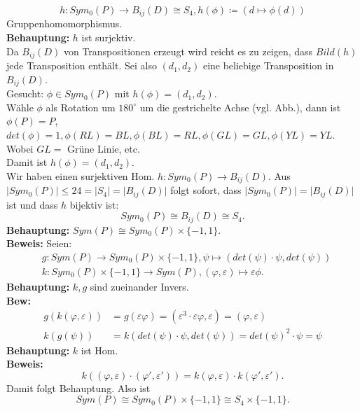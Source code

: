 \begin{problem*}[3]
\begin{equation*}
	h: Sym_0(P) \to B_{ ij }(D) \cong S_4, h(\phi) \coloneqq (d \mapsto \phi(d))
\end{equation*}
Gruppenhomomorphismus.\\
\textbf{Behauptung:} $ h $ ist surjektiv.\\
Da $ B_{ ij }(D)  $ von Transpositionen erzeugt wird reicht es zu zeigen, dass $ Bild(h) $ jede Transposition enthält. Sei also $ (d_1,d_2) $ eine beliebige Transposition in $ B_{ ij }(D)$.\\
Gesucht: $\phi \in Sym_0(P)$ mit $h(\phi) = (d_1,d_2).$\\
Wähle $ \phi $ als Rotation um $ 180^{ \circ } $ um die gestrichelte Achse (vgl. Abb.), dann ist $\phi(P) = P$, $det(\phi) = 1, \phi(RL) = BL, \phi(BL) = RL, \phi(GL) = GL, \phi(YL) = YL$. Wobei $ GL =$ Grüne Linie, etc.\\ 
Damit ist $h(\phi) = (d_1, d_2).$\\
Wir haben einen surjektiven Hom. $h: Sym_0(P) \to B_{ ij }(D)$. Aus $ \vert Sym_0(P) \vert \leq 24 = \vert S_4 \vert = \vert B_{ ij }(D) \vert$ folgt sofort, dass $\vert Sym_0(P) \vert = \vert B_{ ij }(D) \vert$ ist und dass $ h $ bijektiv ist:
\begin{equation*}
	Sym_0(P) \cong B_{ ij }(D) \cong S_4.
\end{equation*}
\textbf{Behauptung:} $Sym(P) \cong Sym_0(P) \times \{ -1, 1 \}.$\\
\textbf{Beweis:} Seien:
\begin{align*}
	&g: Sym(P) \to Sym_0(P) \times \{ -1, 1 \}, \psi \mapsto (det(\psi) \cdot \psi,det(\psi)) \\
	&k: Sym_0(P) \times \{ -1, 1 \} \to Sym(P), (\varphi, \varepsilon) \mapsto \varepsilon \phi.
\end{align*}
\textbf{Behauptung:} $ k,g $ sind zueinander Invers.\\
\textbf{Bew:} 
\begin{align*}
	g(k(\varphi,\varepsilon)) &= g(\varepsilon \varphi) = (\varepsilon^3 \cdot \varepsilon \varphi, \varepsilon) = (\varphi, \varepsilon) 
	\\
	k(g(\psi)) &= k(det(\psi) \cdot \psi, det(\psi) ) = det(\psi)^2 \cdot \psi = \psi
\end{align*}
\textbf{Behauptung:} $ k $ ist Hom.\\
\textbf{Beweis:} 
\begin{equation*}
	k((\varphi, \varepsilon)\cdot (\varphi', \varepsilon')) = k(\varphi, \varepsilon) \cdot k(\varphi',\varepsilon').
\end{equation*}
Damit folgt Behauptung. Also ist 
\begin{equation*}
	Sym(P) \cong Sym_0(P) \times \{ -1, 1 \} \cong S_4 \times \{ -1, 1 \}.
\end{equation*}
\end{problem*}

















